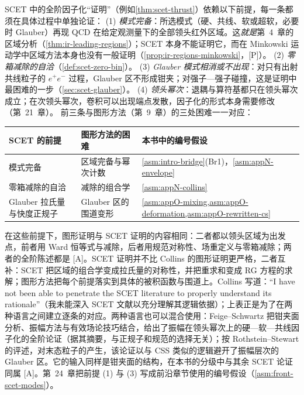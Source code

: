 \begin{remark}\label{rem:scet-assumptions}
SCET 中的全阶因子化“证明”（例如\cref{thm:scet-thrust}）依赖以下前提，每一条都须在具体过程中单独论证：
(1) \emph{模式完备}：所选模式（硬、共线、软或超软，必要时 Glauber）再现 QCD 在给定观测量下的全部领头红外区域。这\emph{就是}第~4~章的区域分析（\cref{thm:ir-leading-regions}）；SCET 本身不能证明它，而在 Minkowski 运动学中区域方法本身也没有一般证明（\cref{prop:ir-regions-minkowski}，[P]）。
(2) \emph{零箱减除的自洽}（\cref{def:scet-zero-bin}）。
(3) \emph{Glauber 模式相消或不出现}：对只有出射共线粒子的 $e^+e^-$ 过程，Glauber 区不形成钳夹；对强子—强子碰撞，这是证明中最困难的一步（\cref{sec:scet-glauber}）。
(4) \emph{领头幂次}：退耦与算符基都只在领头幂次成立；在次领头幂次，卷积可以出现端点发散，因子化的形式本身需要修改（第~21~章）。
前三条与图形方法（第~9~章）的三处困难一一对应：
\begin{center}\small
\renewcommand{\arraystretch}{1.1}
\begin{tabular}{@{}lll@{}}
\toprule
SCET 的前提 & 图形方法的困难 & 本书中的编号假设 \\
\midrule
模式完备 & 区域完备与幂次计数 & \cref{asm:intro-bridge}(Br1)，\cref{asm:appN-envelope} \\
零箱减除的自洽 & 减除的组合学 & \cref{asm:appN-collins} \\
Glauber 拉氏量与快度正规子 & Glauber 区的围道变形 & \cref{asm:appO-mixing,asm:appO-deformation,asm:appO-rewritten-cs} \\
\bottomrule
\end{tabular}
\end{center}
在这些前提下，图形证明与 SCET 证明的内容相同：二者都以领头区域为出发点，前者用 Ward 恒等式与减除，后者用规范对称性、场重定义与零箱减除；两者的全阶陈述都是 [A]。SCET 证明并不比 Collins 的图形证明更严格，二者互补：SCET 把区域的组合学变成拉氏量的对称性，并把重求和变成 RG 方程的求解；图形方法把每个前提落实到具体的被积函数与围道上。Collins 写道：“I have not been able to penetrate the SCET literature to properly understand its rationale”（我未能深入 SCET 文献以充分理解其逻辑依据）\cite[第~15.9~节]{Collins2011}；上表正是为了在两种语言之间建立逐条的对应。两种语言也可以混合使用：Feige--Schwartz 把钳夹面分析、振幅方法与有效场论技巧结合，给出了振幅在领头幂次上的硬—软—共线因子化的全阶论证（据其摘要，与正规子和规范的选择无关）\cite{Feige:2013zla,FeigeSchwartz2014}；按 Rothstein--Stewart 的评述，对末态粒子的产生，该论证以与 CSS 类似的逻辑避开了振幅层次的 Glauber 区\cite[第~10.1~节]{RothsteinStewart2016}。它的输入同样是钳夹面的结构，在本书的分级中与其余 SCET 论证同属 [A]。第~24~章把前提 (1) 与 (3) 写成前沿章节使用的编号假设（\cref{asm:front-scet-modes}）。
\end{remark}

